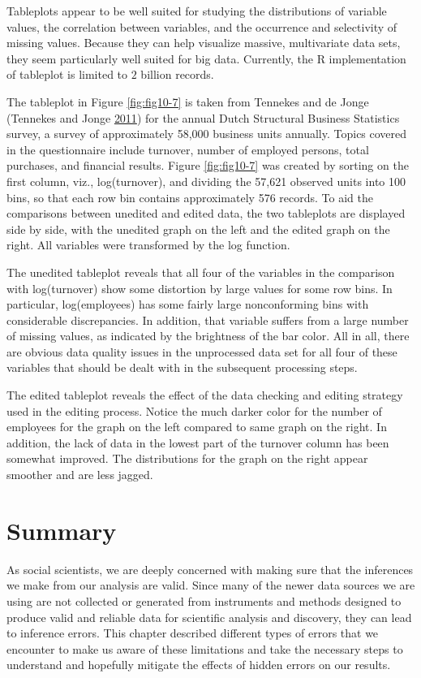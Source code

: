 \documentclass[]{krantz}
\begin{document}
Tableplots appear to be well suited for studying the distributions of
variable values, the correlation between variables, and the occurrence
and selectivity of missing values. Because they can help visualize
massive, multivariate data sets, they seem particularly well suited for
big data. Currently, the R implementation of tableplot is limited to
\(2\) billion records.

The tableplot in Figure \ref{fig:fig10-7} is taken from Tennekes and de
Jonge (Tennekes and Jonge \protect\hyperlink{ref-tennekes2011top}{2011})
for the annual Dutch Structural Business Statistics survey, a survey of
approximately 58,000 business units annually. Topics covered in the
questionnaire include turnover, number of employed persons, total
purchases, and financial results. Figure \ref{fig:fig10-7} was created
by sorting on the first column, viz., log(turnover), and dividing the
57,621 observed units into 100 bins, so that each row bin contains
approximately 576 records. To aid the comparisons between unedited and
edited data, the two tableplots are displayed side by side, with the
unedited graph on the left and the edited graph on the right. All
variables were transformed by the log function.

The unedited tableplot reveals that all four of the variables in the
comparison with log(turnover) show some distortion by large values for
some row bins. In particular, log(employees) has some fairly large
nonconforming bins with considerable discrepancies. In addition, that
variable suffers from a large number of missing values, as indicated by
the brightness of the bar color. All in all, there are obvious data
quality issues in the unprocessed data set for all four of these
variables that should be dealt with in the subsequent processing steps.

The edited tableplot reveals the effect of the data checking and editing
strategy used in the editing process. Notice the much darker color for
the number of employees for the graph on the left compared to same graph
on the right. In addition, the lack of data in the lowest part of the
turnover column has been somewhat improved. The distributions for the
graph on the right appear smoother and are less jagged.

\section{Summary}\label{sec:10-6}

As social scientists, we are deeply concerned with making sure that the
inferences we make from our analysis are valid. Since many of the newer
data sources we are using are not collected or generated from
instruments and methods designed to produce valid and reliable data for
scientific analysis and discovery, they can lead to inference errors.
This chapter described different types of errors that we encounter to
make us aware of these limitations and take the necessary steps to
understand and hopefully mitigate the effects of hidden errors on our
results.
\end{document}
